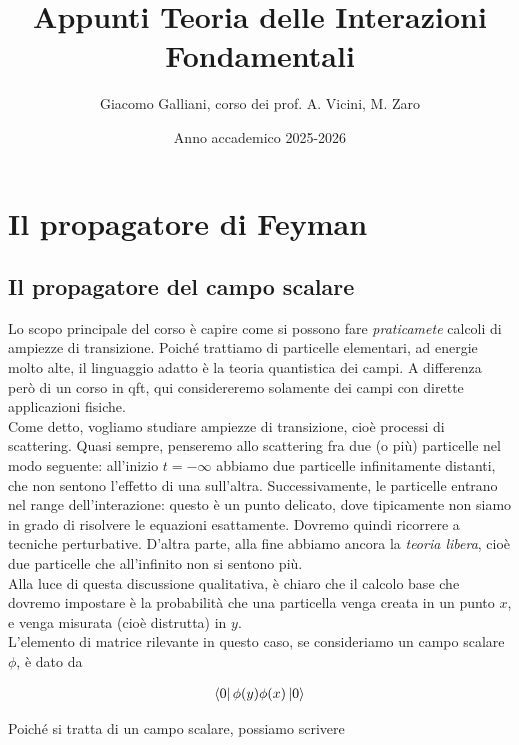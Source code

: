 \documentclass[11pt]{report}
\title{\Huge{\textbf{Appunti Teoria delle Interazioni Fondamentali}}}
\author{Giacomo Galliani, corso dei prof. A. Vicini, M. Zaro}
\date{Anno accademico 2025-2026}
\renewcommand{\contentsname}{Indice}
\begin{document}
\maketitle
\newpage%
\pdfbookmark[section]{\contentsname}{toc}
\tableofcontents
\pagebreak

\chapter{Il propagatore di Feyman}
\section{Il propagatore del campo scalare}

Lo scopo principale del corso è capire come si possono fare \emph{praticamete} calcoli di ampiezze di transizione. Poiché trattiamo di particelle elementari, ad energie molto alte, il linguaggio adatto è la teoria quantistica dei campi. A differenza però di un corso in qft, qui considereremo solamente dei campi con dirette applicazioni fisiche. \\

Come detto, vogliamo studiare ampiezze di transizione, cioè processi di scattering. Quasi sempre, penseremo allo scattering fra due (o più) particelle nel modo seguente: all'inizio \(t = -\infty\) abbiamo due particelle infinitamente distanti, che non sentono l'effetto di una sull'altra. Successivamente, le particelle entrano nel range dell'interazione: questo è un punto delicato, dove tipicamente non siamo in grado di risolvere le equazioni esattamente. Dovremo quindi ricorrere a tecniche perturbative. D'altra parte, alla fine abbiamo ancora la \emph{teoria libera}, cioè due particelle che all'infinito non si sentono più. \\

Alla luce di questa discussione qualitativa, è chiaro che il calcolo base che dovremo impostare è la probabilità che una particella venga creata in un punto \(x\), e venga misurata (cioè distrutta) in \(y\). \\

L'elemento di matrice rilevante in questo caso, se consideriamo un campo scalare \(\phi\), è dato da 

\begin{align}
    \bra{0}\phi(y)\phi(x)\ket{0}
\end{align}

Poiché si tratta di un campo scalare, possiamo scrivere 
\end{document}
